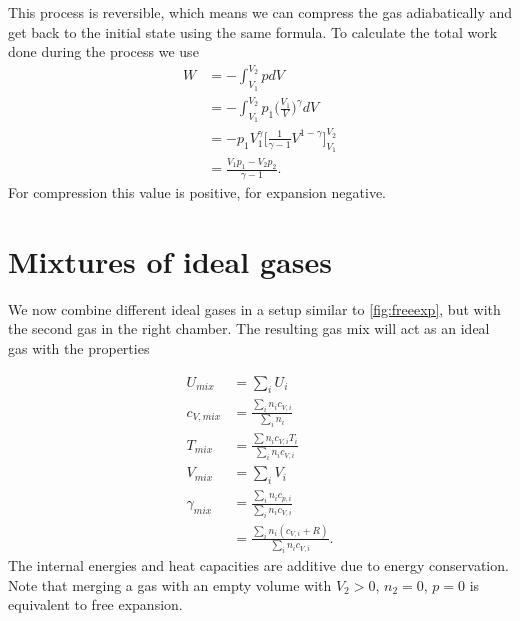 \documentclass[12pt,a4paper]{article}
\numberwithin{equation}{section}
\begin{document}
This process is reversible, which means we can compress the gas adiabatically and get back to the initial state using the same formula.
To calculate the total work done during the process we use
\begin{align}
W &= -\int_{V_1}^{V_2} p dV\\
&= -\int_{V_1}^{V_2} p_1 \Big(\frac{V_1}{V}\Big)^\gamma dV\\
&= -p_1 V_1^\gamma \Big[\frac{1}{\gamma-1}V^{1-\gamma}\Big]_{V_1}^{V_2}\\
&=\frac{V_1 p_1 - V_2 p_2}{\gamma-1}.
\end{align}
For compression this value is positive, for expansion negative.

\section{Mixtures of ideal gases}
We now combine different ideal gases in a setup similar to \autoref{fig:freeexp}, but with the second gas in the right chamber. The resulting gas mix will act as an ideal gas with the properties

\begin{align}
U_{mix} &= \sum\nolimits_i U_i\\
c_{V,mix} &= \frac{\sum_i n_i c_{V,i}}{\sum_i n_i}\\
T_{mix} &= \frac{\sum n_i c_{V,i}T_i}{\sum_i n_i c_{V,i}}\\
V_{mix} &= \sum\nolimits_i V_i\\
\gamma_{mix} &=\frac{\sum_i n_i c_{p,i}}{\sum_i n_i c_{V,i}}\\
&=\frac{\sum_i n_i (c_{V,i}+R)}{\sum_i n_i c_{V,i}}.
\end{align}
The internal energies and heat capacities are additive due to energy conservation. Note that merging a gas with an empty volume with $V_2>0$, $n_2=0$, $p=0$ is equivalent to free expansion.

\newpage
\end{document}
